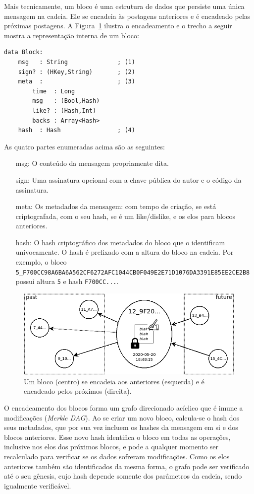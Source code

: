 \documentclass[12pt]{article}
\begin{document}
Mais tecnicamente, um bloco é uma estrutura de dados que persiste uma única
mensagem na cadeia.
Ele se encadeia às postagens anteriores e é encadeado pelas próximas postagens.
A Figura~\ref{fig.block} ilustra o encadeamento e o trecho a seguir mostra a
representação interna de um bloco:
%
{\footnotesize
\begin{verbatim}
data Block:
    msg   : String              ; (1)
    sign? : (HKey,String)       ; (2)
    meta  :                     ; (3)
        time  : Long
        msg   : (Bool,Hash)
        like? : (Hash,Int)
        backs : Array<Hash>
    hash  : Hash                ; (4)
\end{verbatim}
}
%
As quatro partes enumeradas acima são as seguintes:
%
\begin{enumerate}
\item[msg:]  O conteúdo da mensagem propriamente dita.
\item[sign:] Uma assinatura opcional com a chave pública do autor e o código da
             assinatura.
\item[meta:] Os metadados da mensagem: com tempo de criação, se está
             criptografada, com o seu hash, se é um like/dislike, e os elos
             para blocos anteriores.
\item[hash:] O hash criptográfico dos metadados do bloco que o identificam
             univocamente. O hash é prefixado com a altura do bloco na cadeia.
             Por exemplo, o bloco
                \texttt{5\_F700CC98A6BA6A562CF6272AFC1044CB0F049E2E71D1076DA3391E85EE2CE2B8}
             possui altura \texttt{5} e hash \texttt{F700CC...}.
\end{enumerate}

\begin{figure}[ht]
\centering
\includegraphics[width=.75\textwidth]{block.png}
\caption{Um bloco (centro) se encadeia aos anteriores (esquerda) e é encadeado
         pelos próximos (direita).}
\label{fig.block}
\end{figure}

O encadeamento dos blocos forma um grafo direcionado acíclico que é imune a
modificações (\emph{Merkle DAG}).
Ao se criar um novo bloco, calcula-se o hash dos seus metadados, que por sua
vez incluem os hashes da mensagem em si e dos blocos anteriores.
Esse novo hash identifica o bloco em todas as operações, inclusive nos elos dos
próximos blocos, e pode a qualquer momento ser recalculado para verificar se os
dados sofreram modificações.
Como os elos anteriores também são identificados da mesma forma, o grafo pode
ser verificado até o seu gênesis, cujo hash depende somente dos parâmetros da
cadeia, sendo igualmente verificável.
\end{document}
